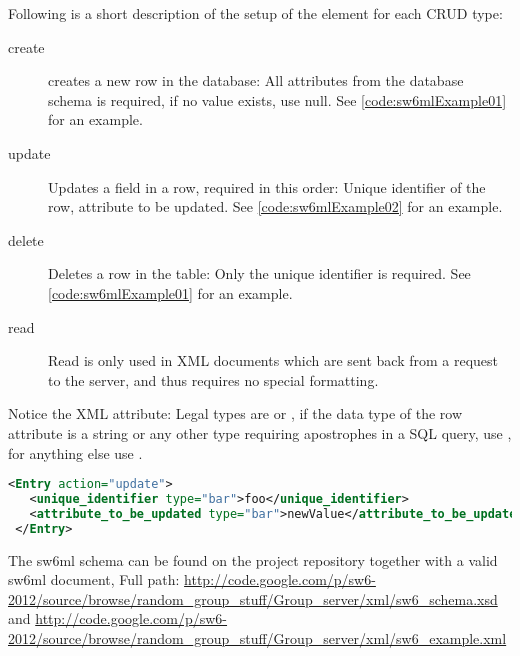 Following is a short description of the setup of the  element for each CRUD type:

\begin{description}
 \item[create] creates a new row in the database: All attributes from the database schema is required, if no value exists, use null. See \autoref{code:sw6mlExample01} for an example.
 \item[update] Updates a field in a row, required in this order: Unique identifier of the row, attribute to be updated. See \autoref{code:sw6mlExample02} for an example.
 \item[delete] Deletes a row in the table: Only the unique identifier is required. See \autoref{code:sw6mlExample01} for an example.
 \item[read]   Read is only used in XML documents which are sent back from a request to the server, and thus requires no special formatting.
\end{description}

Notice the  XML attribute: Legal types are  or , if the data type of the row attribute is a string or any other type requiring apostrophes
in a SQL query, use , for anything else use .

\begin{Code}
\begin{lstlisting}[label=code:sw6mlExample02,language=XML,caption=sw6ml update syntax example]
 <Entry action="update">
   <unique_identifier type="bar">foo</unique_identifier>
   <attribute_to_be_updated type="bar">newValue</attribute_to_be_updated>
 </Entry>
\end{lstlisting}
\end{Code}

The sw6ml schema can be found on the project repository together with a valid sw6ml document,
Full path: \url{http://code.google.com/p/sw6-2012/source/browse/random_group_stuff/Group_server/xml/sw6_schema.xsd}
and \url{http://code.google.com/p/sw6-2012/source/browse/random_group_stuff/Group_server/xml/sw6_example.xml} %

